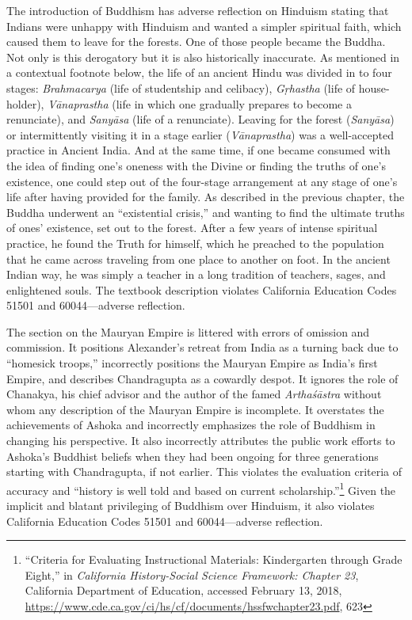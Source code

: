 The introduction of Buddhism has adverse reflection on Hinduism stating that Indians were unhappy with Hinduism and wanted a simpler spiritual faith, which caused them to leave for the forests. One of those people became the Buddha. Not only is this derogatory but it is also historically inaccurate. As mentioned in a contextual footnote below, the life of an ancient Hindu was divided in to four stages: \textit{Brahmacarya}  (life of studentship and celibacy), \textit{Gṛhastha}  (life of house-holder), \textit{Vānaprastha}  (life in which one gradually prepares to become a renunciate), and \textit{Sanyāsa}  (life of a renunciate). Leaving for the forest (\textit{Sanyāsa}) or intermittently visiting it in a stage earlier (\textit{Vānaprastha})  was a well-accepted practice in Ancient India. And at the same time, if one became consumed with the idea of finding one’s oneness with the Divine or finding the truths of one’s existence, one could step out of the four-stage arrangement at any stage of one’s life after having provided for the family. As described in the previous chapter, the Buddha underwent an “existential crisis,” and wanting to find the ultimate truths of ones’ existence, set out to the forest. After a few years of intense spiritual practice, he found the Truth for himself, which he preached to the population that he came across traveling from one place to another on foot. In the ancient Indian way, he was simply a teacher in a long tradition of teachers, sages, and enlightened souls. The textbook description violates California Education Codes 51501 and 60044—adverse reflection.  

The section on the Mauryan Empire is littered with errors of omission and commission. It positions Alexander’s retreat from India as a turning back due to “homesick troops,” incorrectly positions the Mauryan Empire as India’s first Empire, and describes Chandragupta as a cowardly despot. It ignores the role of Chanakya, his chief advisor and the author of the famed \textit{Arthaśāstra}  without whom any description of the Mauryan Empire is incomplete. It overstates the achievements of Ashoka and incorrectly emphasizes the role of Buddhism in changing his perspective. It also incorrectly attributes the public work efforts to Ashoka’s Buddhist beliefs when they had been ongoing for three generations starting with Chandragupta, if not earlier. This violates the evaluation criteria of accuracy and “history is well told and based on current scholarship.”\footnote{“Criteria for Evaluating Instructional Materials: Kindergarten through Grade Eight,” in \textit{California History-Social Science Framework: Chapter 23}, California Department of Education, accessed February 13, 2018, \url{https://www.cde.ca.gov/ci/hs/cf/documents/hssfwchapter23.pdf}, 623} Given the implicit and blatant privileging of Buddhism over Hinduism, it also violates California Education Codes 51501 and 60044—adverse reflection.  

